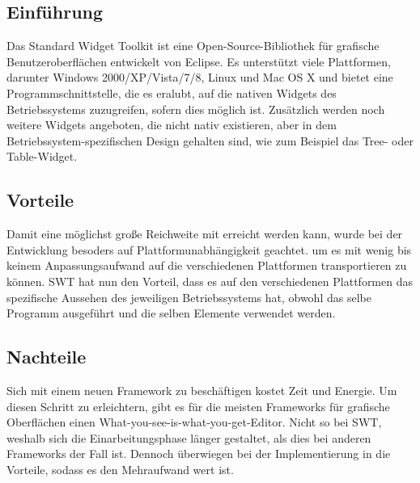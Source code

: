 \subsection{Einführung}
Das Standard Widget Toolkit ist eine Open-Source-Bibliothek für grafische Benutzeroberflächen entwickelt von Eclipse. Es unterstützt viele Plattformen, darunter Windows 2000/XP/Vista/7/8, Linux und Mac OS X und bietet eine Programmschnittstelle, die es eralubt, auf die nativen Widgets des Betriebssystems zuzugreifen, sofern dies möglich ist. Zusätzlich werden noch weitere Widgets angeboten, die nicht nativ existieren, aber in dem Betriebssystem-spezifischen Design gehalten sind, wie zum Beispiel das Tree- oder Table-Widget.

%
%

\subsection{Vorteile}
Damit eine möglichst große Reichweite mit \sblit erreicht werden kann, wurde bei der Entwicklung besoders auf Plattformunabhängigkeit geachtet. um es mit wenig bis keinem Anpassungsaufwand auf die verschiedenen Plattformen transportieren zu können. SWT hat nun den Vorteil, dass es auf den verschiedenen Plattformen das spezifische Aussehen des jeweiligen Betriebssystems hat, obwohl das selbe Programm ausgeführt und die selben Elemente verwendet werden.

\subsection{Nachteile}
Sich mit einem neuen Framework zu beschäftigen kostet Zeit und Energie. Um diesen Schritt zu erleichtern, gibt es für die meisten Frameworks für grafische Oberflächen einen What-you-see-is-what-you-get-Editor. Nicht so bei SWT, weshalb sich die Einarbeitungsphase länger gestaltet, als dies bei anderen Frameworks der Fall ist. Dennoch überwiegen bei der Implementierung in \sblit die Vorteile, sodass es den Mehraufwand wert ist.

%
%